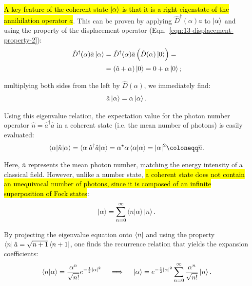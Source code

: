 \hl{A key feature of the coherent state $\ket{\alpha}$ is that it is a right eigenstate of the annihilation operator $\hat{a}$}. This can be proven by applying $\hat{D}^\dagger(\alpha)\hat{a}$ to $\ket{\alpha}$ and using the property  of the displacement operator (Eqn.~\ref{eqn:13-displacement-property-2}):
\begin{align}
\hat{D}^\dagger (\alpha) \hat{a} \ket{\alpha} &= \hat{D}^\dagger (\alpha) \hat{a} \left(\hat{D}(\alpha) \ket{0}\right) = \nonumber \\[0.5ex]
&= (\hat{a} + \alpha) \ket{0} = 0 + \alpha \ket{0}; \label{eqn:13-proof-eigenvalue-step1}
\end{align}

multiplying both sides from the left by $\hat{D}(\alpha)$, we immediately find:
\begin{equation}\label{eqn:13-annihilation-coherent-eigenvalue}
\hat{a} \ket{\alpha} = \alpha \ket{\alpha}.
\end{equation}

Using this eigenvalue relation, the expectation value for the photon number operator $\hat{n} = \hat{a}^\dagger  \hat{a}$ in a coherent state (i.e. the mean number of photons) is easily evaluated:
\begin{equation}\label{eqn:13-coherent-mean-photons}
\braket{\alpha|\hat{n}|\alpha} = \braket{\alpha|\hat{a}^\dagger  \hat{a}|\alpha} = \alpha^\star \alpha \braket{\alpha|\alpha} = |\alpha|^2 \coloneqq \overline{n}.
\end{equation}

Here, $\overline{n}$ represents the mean photon number, matching the energy intensity of a classical field. However, unlike a number state, \hl{a coherent state does not contain an unequivocal number of photons, since it is composed of an infinite superposition of Fock states}:
\begin{equation}\label{eqn:13-coherent-state-fock-expansion}
\ket{\alpha} = \sum_{n=0}^{\infty} \braket{n|\alpha} \ket{n}.
\end{equation}

By projecting the eigenvalue equation onto $\bra{n}$ and using the property $\bra{n}\hat{a} = \sqrt{n+1}\bra{n+1}$, one finds the recurrence relation that yields the expansion coefficients:
\begin{equation}\label{eqn:13-coherent-coefficients}
\braket{n|\alpha} = \frac{\alpha^n}{\sqrt{n!}} e^{-\frac{1}{2}|\alpha|^2} \quad \implies \quad \ket{\alpha} = e^{-\frac{1}{2}|\alpha|^2} \sum_{n=0}^{\infty} \frac{\alpha^n}{\sqrt{n!}} \ket{n}.
\end{equation}


